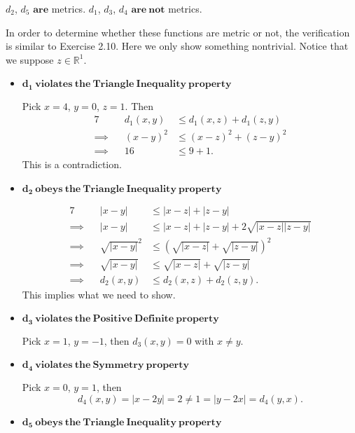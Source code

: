 \begin{Exercise}
	\begin{answer}
		$d_2$, $d_5$ $\mathbf{are}$ metrics.
		$d_1$, $d_3$, $d_4$ $\mathbf{are\ not}$ metrics.
	\end{answer}
	\begin{solution}
		In order to determine whether these functions are metric or not, the verification is similar to Exercise 2.10. Here we only show something nontrivial. Notice that we suppose $z\in\mathbb{R}^1$.
		
		\begin{itemize}
			\item $\mathbf{d_1\ violates\ the\ Triangle\ Inequality \ property}$
			
			Pick $x=4$, $y=0$, $z=1$. Then
			\begin{alignat*}{7}
			\quad&& d_1(x,y) &\leq d_1(x,z) + d_1(z,y) \\
			\implies&& (x-y)^2 &\leq (x-z)^2 + (z-y)^2 \\
			\implies&& 16 &\leq 9 + 1.
			\end{alignat*}
			This is a contradiction.
			
			\item $\mathbf{d_2\ obeys\ the\ Triangle\ Inequality\ property}$
			
			\begin{alignat*}{7}
			\quad&& |x-y| &\leq |x-z| + |z-y| \\
			\implies&& |x-y| &\leq |x-z| + |z-y| + 2\sqrt{|x-z| |z-y|} \\
			\implies&& \sqrt{|x-y|}^2 &\leq \left( \sqrt{|x-z|} + \sqrt{|z-y|} \right)^2 \\
			\implies&& \sqrt{|x-y|} &\leq \sqrt{|x-z|} + \sqrt{|z-y|} \\
			\implies&& d_2(x,y) &\leq d_2(x,z) + d_2(z,y).
			\end{alignat*}
			This implies what we need to show.
			
			\item $\mathbf{d_3\ violates\ the\ Positive\ Definite\ property}$
			
			Pick $x=1$, $y=-1$, then $d_3(x,y) = 0$ with $x\neq y$.
			
			\item $\mathbf{d_4\ violates\ the\ Symmetry\ property}$
			
			Pick $x=0$, $y=1$, then
			$$
			d_4(x,y) = |x-2y| = 2 \neq 1 = |y-2x| = d_4(y,x).
			$$
			
			\item $\mathbf{d_5\ obeys\ the\ Triangle\ Inequality\ property}$
			

\end{itemize}
\end{solution}
\end{Exercise}
